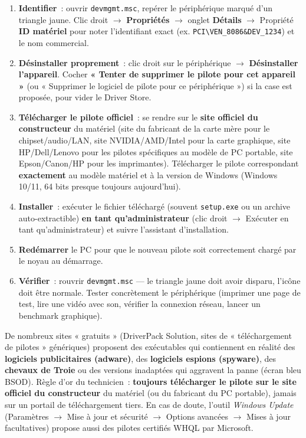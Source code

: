 \documentclass[11pt]{article}
\begin{document}
\begin{methode}
\begin{enumerate}
  \item \textbf{Identifier}~: ouvrir \texttt{devmgmt.msc}, repérer le périphérique marqué d'un triangle jaune. Clic droit $\rightarrow$ \textbf{Propriétés} $\rightarrow$ onglet \textbf{Détails} $\rightarrow$ Propriété \textbf{ID matériel} pour noter l'identifiant exact (ex. \texttt{PCI\textbackslash VEN\_8086\&DEV\_1234}) et le nom commercial.
  \item \textbf{Désinstaller proprement}~: clic droit sur le périphérique $\rightarrow$ \textbf{Désinstaller l'appareil}. Cocher \textbf{« Tenter de supprimer le pilote pour cet appareil »} (ou « Supprimer le logiciel de pilote pour ce périphérique ») si la case est proposée, pour vider le Driver Store.
  \item \textbf{Télécharger le pilote officiel}~: se rendre sur le \textbf{site officiel du constructeur} du matériel (site du fabricant de la carte mère pour le chipset/audio/LAN, site NVIDIA/AMD/Intel pour la carte graphique, site HP/Dell/Lenovo pour les pilotes spécifiques au modèle de PC portable, site Epson/Canon/HP pour les imprimantes). Télécharger le pilote correspondant \textbf{exactement} au modèle matériel et à la version de Windows (Windows 10/11, 64 bits presque toujours aujourd'hui).
  \item \textbf{Installer}~: exécuter le fichier téléchargé (souvent \texttt{setup.exe} ou un archive auto-extractible) \textbf{en tant qu'administrateur} (clic droit $\rightarrow$ Exécuter en tant qu'administrateur) et suivre l'assistant d'installation.
  \item \textbf{Redémarrer} le PC pour que le nouveau pilote soit correctement chargé par le noyau au démarrage.
  \item \textbf{Vérifier}~: rouvrir \texttt{devmgmt.msc} — le triangle jaune doit avoir disparu, l'icône doit être normale. Tester concrètement le périphérique (imprimer une page de test, lire une vidéo avec son, vérifier la connexion réseau, lancer un benchmark graphique).
\end{enumerate}
\end{methode}

\begin{attention}
De nombreux sites « gratuits » (DriverPack Solution, sites de « téléchargement de pilotes » génériques) proposent des exécutables qui contiennent en réalité des \textbf{logiciels publicitaires (adware)}, des \textbf{logiciels espions (spyware)}, des \textbf{chevaux de Troie} ou des versions inadaptées qui aggravent la panne (écran bleu BSOD). Règle d'or du technicien~: \textbf{toujours télécharger le pilote sur le site officiel du constructeur} du matériel (ou du fabricant du PC portable), jamais sur un portail de téléchargement tiers. En cas de doute, l'outil \emph{Windows Update} (Paramètres $\rightarrow$ Mise à jour et sécurité $\rightarrow$ Options avancées $\rightarrow$ Mises à jour facultatives) propose aussi des pilotes certifiés WHQL par Microsoft.
\end{attention}
\end{document}
